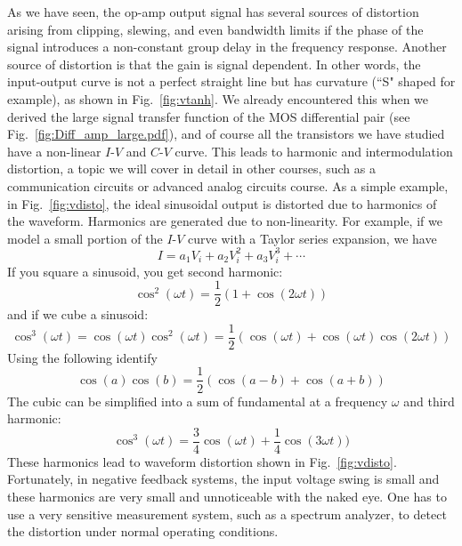 As we have seen, the op-amp output signal has several sources of distortion arising from clipping, slewing, and even bandwidth limits if the phase of the signal introduces a non-constant group delay in the frequency response.  Another source of distortion is that the gain is signal dependent.  In other words, the input-output curve is not a perfect straight line but has curvature (``S" shaped for example), as shown in Fig.~\ref{fig:vtanh}.  We already encountered this when we derived the large signal transfer function of the MOS differential pair (see Fig.~\ref{fig:Diff_amp_large.pdf}), and of course all the transistors we have studied have a non-linear $I$-$V$ and $C$-$V$ curve.  This leads to harmonic and intermodulation distortion, a topic we will cover in detail in other courses, such as a communication circuits or advanced analog circuits course.  As a simple example, in Fig.~\ref{fig:vdisto}, the ideal sinusoidal output is distorted due to harmonics of the waveform.  Harmonics are generated due to non-linearity.  For example, if we model a small portion of the $I$-$V$ curve with a Taylor series expansion, we have
\begin{equation}
	I = a_1 V_i + a_2 V_i^2 + a_3 V_i^3 + \cdots
\end{equation}
If you square a sinusoid, you get second harmonic:
\begin{equation}
	\cos^2(\omega t) = \frac{1}{2} \left(1 + \cos(2 \omega t) \right)
\end{equation}
and if we cube a sinusoid:
\begin{equation}
	\cos^3(\omega t) = \cos(\omega t) \cos^2(\omega t) = \frac{1}{2} \left(\cos(\omega t) + \cos(\omega t)\cos(2 \omega t) \right)
\end{equation}
Using the following identify
\begin{equation}
	\cos(a) \cos(b) = \frac{1}{2} \left( \cos(a - b) + \cos(a + b) \right) 
\end{equation}
The cubic can be simplified into a sum of fundamental at a frequency $\omega$ and third harmonic:
\begin{equation}
	\cos^3(\omega t) =  \frac{3}{4} \cos(\omega t) + \frac{1}{4} \cos(3 \omega t)) 	
\end{equation}
These harmonics lead to waveform distortion shown in Fig.~\ref{fig:vdisto}.  Fortunately, in negative feedback systems, the input voltage swing is small and these harmonics are very small and unnoticeable with the naked eye.  One has to use a very sensitive measurement system, such as a spectrum analyzer, to detect the distortion under normal operating conditions.
